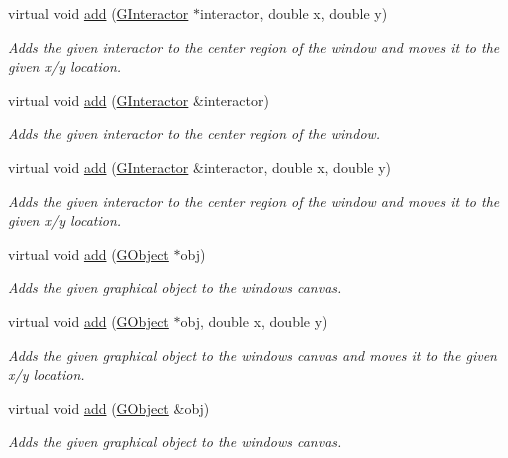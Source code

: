 \begin{DoxyCompactItemize}
virtual void \mbox{\hyperlink{classGWindow_aca25fb0fc7d200e9c4fd23830d2d413d}{add}} (\mbox{\hyperlink{classGInteractor}{G\+Interactor}} $\ast$interactor, double x, double y)
\begin{DoxyCompactList}\small\item\em Adds the given interactor to the center region of the window and moves it to the given x/y location. \end{DoxyCompactList}\item 
virtual void \mbox{\hyperlink{classGWindow_a33b08fe5428ed634a658deab076099f7}{add}} (\mbox{\hyperlink{classGInteractor}{G\+Interactor}} \&interactor)
\begin{DoxyCompactList}\small\item\em Adds the given interactor to the center region of the window. \end{DoxyCompactList}\item 
virtual void \mbox{\hyperlink{classGWindow_a56840f453f9938083c24c7fb1a4c377e}{add}} (\mbox{\hyperlink{classGInteractor}{G\+Interactor}} \&interactor, double x, double y)
\begin{DoxyCompactList}\small\item\em Adds the given interactor to the center region of the window and moves it to the given x/y location. \end{DoxyCompactList}\item 
virtual void \mbox{\hyperlink{classGWindow_a2327d64402837eedd533c098014e46d9}{add}} (\mbox{\hyperlink{classGObject}{G\+Object}} $\ast$obj)
\begin{DoxyCompactList}\small\item\em Adds the given graphical object to the window\textquotesingle{}s canvas. \end{DoxyCompactList}\item 
virtual void \mbox{\hyperlink{classGWindow_ab5388ece7a50b46e0ee72e11fe202609}{add}} (\mbox{\hyperlink{classGObject}{G\+Object}} $\ast$obj, double x, double y)
\begin{DoxyCompactList}\small\item\em Adds the given graphical object to the window\textquotesingle{}s canvas and moves it to the given x/y location. \end{DoxyCompactList}\item 
virtual void \mbox{\hyperlink{classGWindow_a7f596867e2d8f9dfb816b3d496ea074f}{add}} (\mbox{\hyperlink{classGObject}{G\+Object}} \&obj)
\begin{DoxyCompactList}\small\item\em Adds the given graphical object to the window\textquotesingle{}s canvas. \end{DoxyCompactList}\item 

\end{DoxyCompactItemize}

